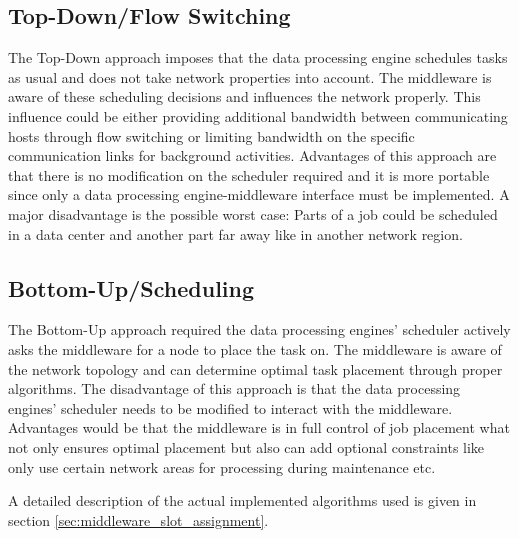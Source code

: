 \subsection{Top-Down/Flow Switching}
The Top-Down approach imposes that the data processing engine schedules tasks as usual and
does not take network properties into account. The middleware is aware of these scheduling decisions
and influences the network properly. This influence could be either providing additional bandwidth
between communicating hosts through flow switching or limiting bandwidth on the specific
communication links for background activities. Advantages of this approach are that there is no
modification on the scheduler required and it is more portable since only a data processing
engine-middleware interface must be implemented. A major disadvantage is the possible worst case:
Parts of a job could be scheduled in a data center and another part far away like in another network
region.

\subsection{Bottom-Up/Scheduling}
The Bottom-Up approach required the data processing engines' scheduler actively asks the
middleware for a node to place the task on. The middleware is aware of the network topology and can
determine optimal task placement through proper algorithms. The disadvantage of this approach is
that the data processing engines' scheduler needs to be modified to interact with the middleware.
Advantages would be that the middleware is in full control of job placement what not only ensures
optimal placement but also can add optional constraints like only use certain network areas for
processing during maintenance etc.

A detailed description of the actual implemented algorithms used is given in section
\ref{sec:middleware_slot_assignment}.
